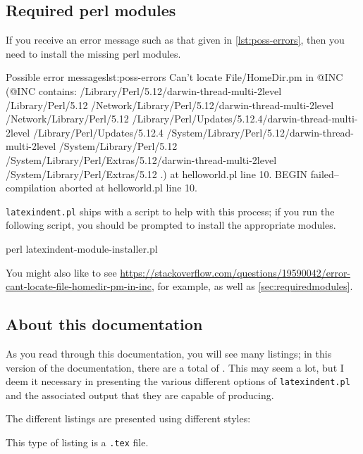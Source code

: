 \subsection{Required perl modules}
 If you receive an error message such as that given in
 \cref{lst:poss-errors}, then you need to install the missing perl modules.
 \begin{cmhlistings}[style=tcblatex,language=Perl]{Possible error messages}{lst:poss-errors}
Can't locate File/HomeDir.pm in @INC (@INC contains: /Library/Perl/5.12/darwin-thread-multi-2level /Library/Perl/5.12 /Network/Library/Perl/5.12/darwin-thread-multi-2level /Network/Library/Perl/5.12 /Library/Perl/Updates/5.12.4/darwin-thread-multi-2level /Library/Perl/Updates/5.12.4 /System/Library/Perl/5.12/darwin-thread-multi-2level /System/Library/Perl/5.12 /System/Library/Perl/Extras/5.12/darwin-thread-multi-2level /System/Library/Perl/Extras/5.12 .) at helloworld.pl line 10.
BEGIN failed--compilation aborted at helloworld.pl line 10.
\end{cmhlistings}
 \texttt{latexindent.pl} ships with a script to help with this process; if you run the
 following script, you should be prompted to install the appropriate modules.

 \begin{commandshell}
perl latexindent-module-installer.pl
\end{commandshell}

 You might also like to see
 \href{https://stackoverflow.com/questions/19590042/error-cant-locate-file-homedir-pm-in-inc}{https://stackoverflow.com/questions/19590042/error-cant-locate-file-homedir-pm-in-inc},
 for example, as well as \vref{sec:requiredmodules}.

\subsection{About this documentation}
 As you read through this documentation, you will see many listings; in this version of
 the documentation, there are a total of \totallstlistings. This may seem a lot, but I
 deem it necessary in presenting the various different options of \texttt{latexindent.pl}
 and the associated output that they are capable of producing.

 The different listings are presented using different styles:

 \begin{minipage}{.4\textwidth}
 \end{minipage}%
 \hfill
 \begin{minipage}{.4\textwidth}
  This type of listing is a \texttt{.tex} file.
 \end{minipage}%

